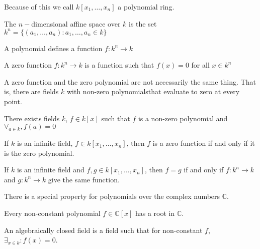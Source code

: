 \documentclass[crop=false,class=article,oneside]{standalone}
\begin{document}
            \begin{remark}
                Because of this we call
                $k[x_1,\hdots ,x_n]$ a polynomial ring.
            \end{remark}
            \begin{definition}
                The $n-$dimensional affine space over
                $k$ is the set
                $k^{n}%
                 =\{(a_1,\hdots,a_n):a_1,\hdots,a_n \in k\}$
            \end{definition}
            \begin{remark}
                A polynomial defines a function
                $f:k^{n}\rightarrow{k}$
            \end{remark}
            \begin{definition}
                A zero function $f:k^{n}\rightarrow{k}$
                is a function such that $f(x)=0$
                for all $x\in{k^{n}}$
            \end{definition}
            \begin{remark}
                A zero function and the zero polynomial are
                not necessarily the same thing. That is,
                there are fields $k$ with non-zero
                polynomialsthat evaluate to
                zero at every point.
            \end{remark}
            \begin{theorem}
                There exists fields $k$, $f\in k[x]$ such
                that $f$ is a non-zero polynomial and
                $\forall_{a\in k},f(a)=0$
            \end{theorem}
            \begin{theorem}
                If $k$ is an infinite field,
                $f\in k[x_1,\hdots ,x_n]$, then $f$ is a
                zero function if and only if it is
                the zero polynomial.
            \end{theorem}
            \begin{theorem}
                If $k$ is an infinite field and
                $f,g\in k[x_1,\hdots,x_n]$, then $f=g$ if and
                only if $f:k^n\rightarrow k$ and
                $g:k^n \rightarrow k$ give
                the same function.
            \end{theorem}
            There is a special property for polynomials
            over the complex numbers $\mathbb{C}$.
            \begin{theorem}
                Every non-constant polynomial
                $f\in\mathbb{C}[x]$ has a root in $\mathbb{C}$.
            \end{theorem}
            \begin{definition}
                An algebraically closed field is a field
                such that for non-constant $f$,
                $\exists_{x\in k}:f(x)=0$.
            \end{definition}
\end{document}
